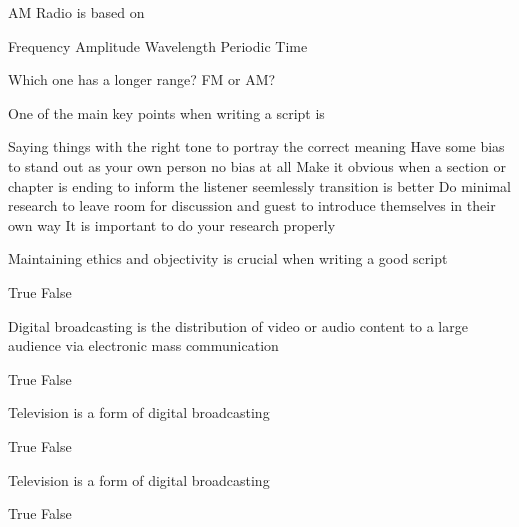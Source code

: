 \documentclass[theme=sleek, randomorder, hidesidemenu]{webquiz}
\begin{document}
\begin{question}
  AM Radio is based on
  \begin{choice}
    \incorrect Frequency
    \correct Amplitude
    \incorrect Wavelength
    \incorrect Periodic Time
  \end{choice}
\end{question}

\begin{question}
  Which one has a longer range? FM or AM?
\end{question}

\begin{question}
  One of the main key points when writing a script is
  \begin{choice}
    \correct Saying things with the right tone to portray the correct meaning
    \incorrect Have some bias to stand out as your own person
    \feedback no bias at all
    \incorrect Make it obvious when a section or chapter is ending to inform the listener
    \feedback seemlessly transition is better
    \incorrect Do minimal research to leave room for discussion and guest to introduce themselves in their own way
    \feedback It is important to do your research properly
  \end{choice}
\end{question}

\begin{question}
    Maintaining ethics and objectivity is crucial when writing a good script
  \begin{choice}
    \correct True
    \incorrect False
  \end{choice}
\end{question}

\begin{question}
    Digital broadcasting is the distribution of video or audio content to a large audience via electronic mass communication
  \begin{choice}
    \correct True
    \incorrect False
  \end{choice}
\end{question}

\begin{question}
  Television is a form of digital broadcasting
  \begin{choice}
    \correct True
    \incorrect False
  \end{choice}
\end{question}

\begin{question}
  Television is a form of digital broadcasting
  \begin{choice}
    \correct True
    \incorrect False
  \end{choice}
\end{question}
\end{document}
